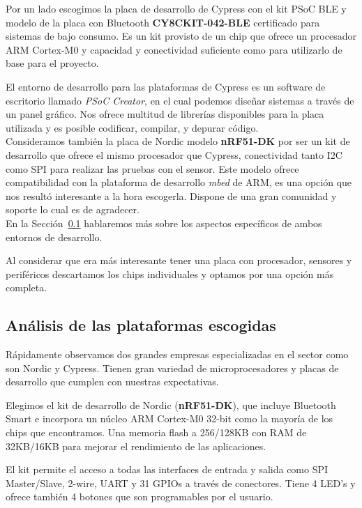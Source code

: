Por un lado escogimos la placa de desarrollo de Cypress con el kit PSoC BLE y modelo de la placa con Bluetooth \textbf{CY8CKIT-042-BLE} certificado para sistemas de bajo consumo. Es un kit provisto de un chip que ofrece un procesador ARM Cortex-M0 y capacidad y conectividad suficiente como para utilizarlo de base para el proyecto.

El entorno de desarrollo para las plataformas de Cypress es un software de escritorio llamado \textit{PSoC Creator}, en el cual podemos diseñar sistemas a través de un panel gráfico. Nos ofrece multitud de librerías disponibles para la placa utilizada y es posible codificar, compilar, y depurar código.\\

Consideramos también la placa de Nordic modelo \textbf{nRF51-DK} por ser un kit de desarrollo que ofrece el mismo procesador que Cypress, conectividad tanto I2C como SPI para realizar las pruebas con el sensor. 
Este modelo ofrece compatibilidad con la plataforma de desarrollo \textit{mbed} de ARM, es una opción que nos resultó interesante a la hora escogerla. Dispone de una gran comunidad y soporte lo cual es de agradecer.\\

En la Sección~\ref{makereference3.4} hablaremos más sobre los aspectos específicos de ambos entornos de desarrollo.

Al considerar que era más interesante tener una placa con procesador, sensores y periféricos descartamos los chips individuales y optamos por una opción más completa.

\subsection{Análisis de las plataformas escogidas}
\label{makereference3.4}

Rápidamente observamos dos grandes empresas especializadas en el sector como son Nordic y Cypress. Tienen gran variedad de microprocesadores y placas de desarrollo que cumplen con nuestras expectativas.

Elegimos el kit de desarrollo de Nordic (\textbf{nRF51-DK}), que incluye Bluetooth Smart e incorpora un núcleo ARM Cortex-M0 32-bit como la mayoría de los chips que encontramos. Una memoria flash a 256/128KB con RAM de 32KB/16KB para mejorar el rendimiento de las aplicaciones.

El kit permite el acceso a todas las interfaces de entrada y salida como SPI Master/Slave, 2-wire, UART y 31 GPIOs a través de conectores. Tiene 4 LED’s y ofrece también 4 botones que son programables por el usuario. 

